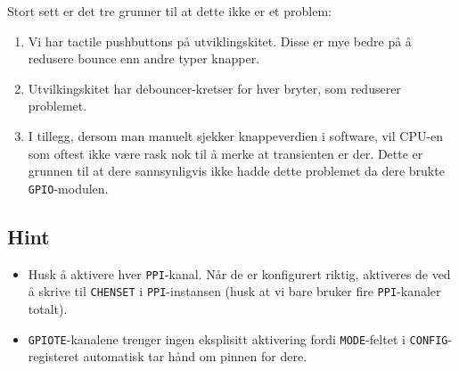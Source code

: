 Stort sett er det tre grunner til at dette ikke er et problem:

\begin{enumerate}
    \item Vi har tactile pushbuttons på utviklingskitet. Disse er mye bedre på å redusere bounce enn andre typer knapper.
    \item Utvilkingskitet har debouncer-kretser for hver bryter, som reduserer problemet.
    \item I tillegg, dersom man manuelt sjekker knappeverdien i software, vil CPU-en som oftest ikke være rask nok til å merke at transienten er der. Dette er grunnen til at dere sannsynligvis ikke hadde dette problemet da dere brukte \verb|GPIO|-modulen.
\end{enumerate}

\subsection{Hint}\label{subsec:PPI-hint}


\begin{itemize}
    \item Husk å aktivere hver \verb|PPI|-kanal. Når de er konfigurert riktig, aktiveres de ved å skrive til \verb|CHENSET| i \verb|PPI|-instansen (husk at vi bare bruker fire \verb|PPI|-kanaler totalt).
    \item \verb|GPIOTE|-kanalene trenger ingen eksplisitt aktivering fordi \verb|MODE|-feltet i \verb|CONFIG|-registeret automatisk tar hånd om pinnen for dere.
\end{itemize}

